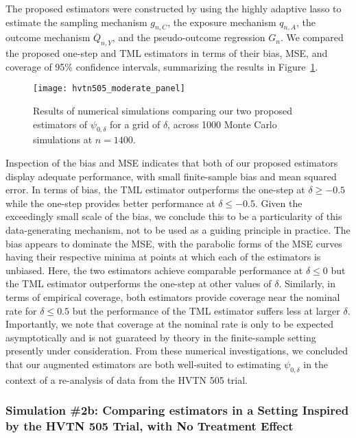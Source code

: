 The proposed estimators were constructed by using the highly adaptive lasso to
estimate the sampling mechanism $g_{n,C}$, the exposure mechanism $q_{n,A}$, the
outcome mechanism $\overline{Q}_{n,Y}$, and the pseudo-outcome regression $G_n$.
We compared the proposed one-step and TML estimators in terms of their bias,
MSE, and coverage of 95\% confidence intervals, summarizing the results in
Figure~\ref{fig:hvtn_sim_moderate}.
\begin{figure}[H]
  \centering
  \texttt{[image: hvtn505\_moderate\_panel]}
  \caption{Results of numerical simulations comparing our two proposed
  estimators of $\psi_{0,\delta}$ for a grid of $\delta$, across 1000 Monte
  Carlo simulations at $n = 1400$.}
  \label{fig:hvtn_sim_moderate}
\end{figure}

Inspection of the bias and MSE indicates that both of our proposed estimators
display adequate performance, with small finite-sample bias and mean squared
error. In terms of bias, the TML estimator outperforms the one-step at $\delta
\geq -0.5$ while the one-step provides better performance at $\delta \leq -0.5$.
Given the exceedingly small scale of the bias, we conclude this to be
a particularity of this data-generating mechanism, not to be used as a guiding
principle in practice. The bias appears to dominate the MSE, with the parabolic
forms of the MSE curves having their respective minima at points at which each
of the estimators is unbiased. Here, the two estimators achieve comparable
performance at $\delta \leq 0$ but the TML estimator outperforms the one-step at
other values of $\delta$. Similarly, in terms of empirical coverage, both
estimators provide coverage near the nominal rate for $\delta \leq 0.5$ but the
performance of the TML estimator suffers less at larger $\delta$. Importantly,
we note that coverage at the nominal rate is only to be expected asymptotically
and is not guarateed by theory in the finite-sample setting presently under
consideration. From these numerical investigations, we concluded that our
augmented estimators are both well-suited to estimating $\psi_{0,\delta}$ in the
context of a re-analysis of data from the HVTN 505 trial.

\subsubsection{Simulation \#2b: Comparing estimators in a Setting Inspired by
the HVTN 505 Trial, with No Treatment Effect}\label{sim2_supp}

